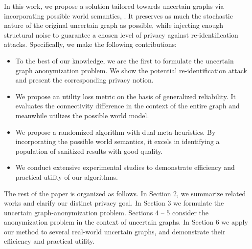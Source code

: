 In this work, we propose a solution tailored towards uncertain graphs via incorporating possible world semantics, {\methodName}. 
It preserves as much the stochastic nature of the original uncertain graph as possible, while injecting enough structural noise to guarantee a chosen level of privacy against re-identification attacks.
Specifically, we make the following contributions:
\begin{itemize}
\item To the best of our knowledge, we are the first to formulate the uncertain graph anonymization problem. 
 We show the potential re-identification attack and present the corresponding privacy notion. 
\item We propose an utility loss metric on the basis of generalized reliability. It evaluates the connectivity difference in the context of the entire graph and meanwhile utilizes the possible world model. 
\item We propose a randomized algorithm with dual meta-heuristics. By incorporating the possible world semantics, it excels in identifying a population of sanitized results with good quality.
\item We conduct extensive experimental studies to demonstrate efficiency and practical utility of our algorithms.
\end{itemize}

The rest of the paper is organized as follows. In Section 2, we summarize related works and clarify our distinct privacy goal. In Section 3 we formulate the uncertain graph-anonymization problem. Sections 4 – 5 consider the anonymization problem in the context of uncertain graphs.  In Section 6 we apply our method to several real-world uncertain graphs, and demonstrate their efficiency and practical utility. 


